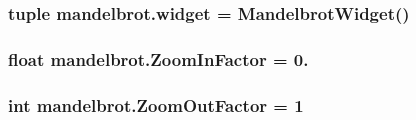 \subsubsection[{widget}]{\setlength{\rightskip}{0pt plus 5cm}tuple mandelbrot.\+widget = {\bf Mandelbrot\+Widget}()}\label{namespacemandelbrot_af1a0634cd8b41b6157f406a73b59b99c}
\hypertarget{namespacemandelbrot_afb7f7b076ee5b732b9ec1fe970d5f868}{}
\subsubsection[{Zoom\+In\+Factor}]{\setlength{\rightskip}{0pt plus 5cm}float mandelbrot.\+Zoom\+In\+Factor = 0.}\label{namespacemandelbrot_afb7f7b076ee5b732b9ec1fe970d5f868}
\hypertarget{namespacemandelbrot_a43a62e3fa004745bdf91431cdf394939}{}
\subsubsection[{Zoom\+Out\+Factor}]{\setlength{\rightskip}{0pt plus 5cm}int mandelbrot.\+Zoom\+Out\+Factor = 1}\label{namespacemandelbrot_a43a62e3fa004745bdf91431cdf394939}
